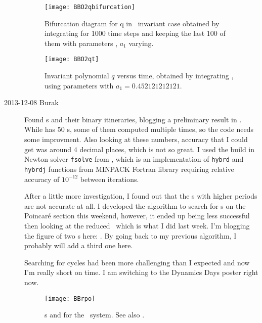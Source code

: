 \begin{description}
\begin{figure}%
  \begin{center}
  \texttt{[image: BBO2qbifurcation]}
  \end{center}
  \caption{
Bifurcation diagram for q in \ invariant case obtained by integrating
 for 1000 time steps and keeping the last 100 of them with parameters ,
$a_1$ varying.
    }
  \label{fig:BBO2qbifurcation}
\end{figure}

\begin{figure}%
  \begin{center}
  \texttt{[image: BBO2qt]}
  \end{center}
  \caption{
Invariant polynomial $q$ versus time, obtained by integrating ,
using parameters  with $a_1 = 0.452121212121$.
    }
  \label{fig:BBO2qt}
\end{figure}

\item[2013-12-08 Burak] Found \rpo s and their binary itineraries, blogging
a preliminary result in . While  has 50 \rpo s,
some of them computed multiple times, so the code needs some improvment.
Also looking at these numbers, accuracy that I could get was around 4 decimal
places, which is not so great. I used the build in Newton solver \texttt{fsolve}
from  , which is an implementation of
\texttt{hybrd} and \texttt{hybrdj} functions from 
{MINPACK Fortran library} requiring relative accuracy of $10^{-12}$ between iterations.

After a little more investigation, I found out that the \rpo s with higher periods
are not accurate at all. I developed the algorithm to search for \rpo s on the
Poincar\'e section this weekend, however, it ended up being less successful then
looking at the reduced \statesp\ which is what I did last week. I'm blogging
the figure of two \rpo s here: . By going back to my
previous algorithm, I probably will add a third one here.

Searching for cycles had been more challenging than I expected and now I'm really
short on time. I am switching to the Dynamics Days poster right now.

\begin{figure}%
  \begin{center}
  \texttt{[image: BBrpo]}
  \end{center}
  \caption{
	\Rpo s  and  for  the \twomode\ system.
    See also .
    }
  \label{fig:BBrpo}
\end{figure}


\end{description}
